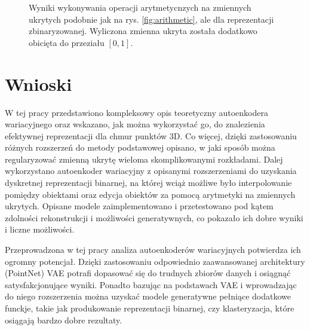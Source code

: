 \documentclass{iithesis}
\begin{document}
\begin{figure}
    \caption{\label{fig:binary_arithmetic} Wyniki wykonywania operacji arytmetycnzych
    na zmiennych ukrytych podobnie jak na rys. \ref{fig:arithmetic}, ale dla
    reprezentacji zbinaryzowanej. Wyliczona zmienna ukryta została dodatkowo
    obicięta do przeziału $[0,1]$.}
\end{figure}

\chapter{Wnioski}
W tej pracy przedstawiono kompleksowy opis teoretyczny autoenkodera wariacyjnego
oraz wskazano, jak można wykorzystać go, do znalezienia efektywnej reprezentacji dla
chmur punktów 3D. Co więcej, dzięki zastosowaniu różnych rozszerzeń do metody podstawowej
opisano, w jaki sposób można regularyzować zmienną ukrytę wieloma skomplikowanymi rozkładami.
Dalej wykorzystano autoenkoder wariacyjny z opisanymi rozszerzeniami do uzyskania dyskretnej
reprezentacji binarnej, na której wciąż możliwe było interpolowanie pomiędzy obiektami
oraz edycja obiektów za pomocą arytmetyki na zmiennych ukrytych.
Opisane modele zaimplementowano i przetestowano pod kątem zdolności rekonstrukcji i możliwości
generatywnych, co pokazało ich dobre wyniki i liczne możliwości.

Przeprowadzona w tej pracy analiza autoenkoderów wariacyjnych potwierdza ich ogromny potencjał.
Dzięki zastosowaniu odpowiednio zaawansowanej architektury (PointNet) VAE potrafi dopasować
się do trudnych zbiorów danych i osiągnąć satysfakcjonujące wyniki.
Ponadto bazując na podstawach VAE i wprowadzając do niego rozszerzenia można uzyskać
modele generatywne pełniące dodatkowe funckje, takie jak produkowanie reprezentacji binarnej,
czy klasteryzacja, które osiągają bardzo dobre rezultaty.

\clearpage



\end{document}
